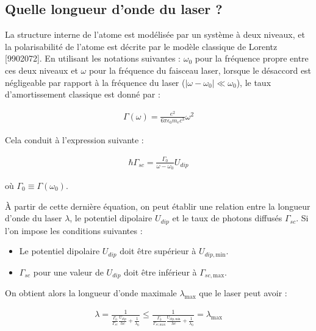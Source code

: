 \subsection{Quelle longueur d'onde du laser ?}

La structure interne de l'atome est modélisée par un système à deux niveaux, et la polarisabilité de l'atome est décrite par le modèle classique de Lorentz {\color{red}[9902072]}. En utilisant les notations suivantes : $\omega_0$ pour la fréquence propre entre ces deux niveaux et $\omega$ pour la fréquence du faisceau laser, lorsque le désaccord est négligeable par rapport à la fréquence du laser ($|\omega - \omega_0| \ll \omega_0$), le taux d'amortissement classique est donné par :

\begin{eqnarray}\label{eq:amort.classique}
	\Gamma ( \omega )  = \frac{ e^2 }{6 \pi \epsilon_0 m_e c^3 } \omega^2 
\end{eqnarray}

Cela conduit à l'expression suivante :

\begin{eqnarray}
	\hbar \Gamma_{sc} = \frac{\Gamma_0}{ \omega - \omega_0 }U_{dip}
\end{eqnarray}

où $\Gamma_0 \equiv \Gamma ( \omega_0 )$.

À partir de cette dernière équation, on peut établir une relation entre la longueur d'onde du laser $\lambda$, le potentiel dipolaire $U_{dip}$ et le taux de photons diffusés $\Gamma_{sc}$. Si l'on impose les conditions suivantes :

\begin{itemize}
	\item Le potentiel dipolaire $U_{dip}$ doit être supérieur à $U_{dip , \text{min}}$.
	\item $\Gamma_{sc}$ pour une valeur de $U_{dip}$ doit être inférieur à $\Gamma_{sc , \text{max}}$.
\end{itemize}

On obtient alors la longueur d'onde maximale $\lambda_{\text{max}}$ que le laser peut avoir :

\begin{eqnarray}
	\lambda  =  \frac { 1 }{ \frac{\Gamma_0 }{\Gamma_{sc} }\frac{U_{dip}}{ h c } + \frac{ 1 }{\lambda_0}} \leq  \frac { 1 }{ \frac{\Gamma_0  }{\Gamma_{sc , \text{max}} }\frac{U_{dip , \text{min}}}{ h c } + \frac{ 1 }{\lambda_0}} = \lambda_{\text{max}}
\end{eqnarray}

